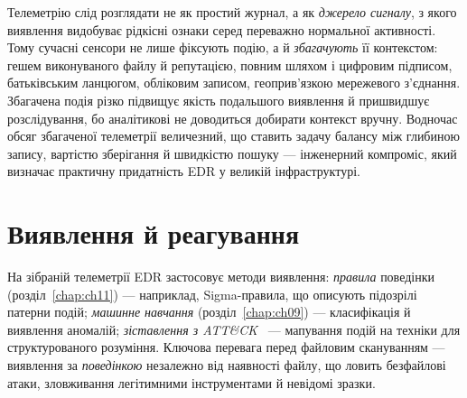 \begin{tikzfig}
\end{tikzfig}

Телеметрію слід розглядати не як простий журнал, а як \emph{джерело сигналу}, з якого виявлення видобуває рідкісні ознаки серед переважно нормальної активності. Тому сучасні сенсори не лише фіксують подію, а й \emph{збагачують} її контекстом: гешем виконуваного файлу й репутацією, повним шляхом і цифровим підписом, батьківським ланцюгом, обліковим записом, геоприв'язкою мережевого з'єднання. Збагачена подія різко підвищує якість подальшого виявлення й пришвидшує розслідування, бо аналітикові не доводиться добирати контекст вручну. Водночас обсяг збагаченої телеметрії величезний, що ставить задачу балансу між глибиною запису, вартістю зберігання й швидкістю пошуку --- інженерний компроміс, який визначає практичну придатність EDR у великій інфраструктурі.

\section{Виявлення й реагування}\label{sec:ch10-edr}

На зібраній телеметрії EDR застосовує методи виявлення: \emph{правила} поведінки (розділ~\ref{chap:ch11}) --- наприклад, Sigma-правила, що описують підозрілі патерни подій; \emph{машинне навчання} (розділ~\ref{chap:ch09}) --- класифікація й виявлення аномалій; \emph{зіставлення з ATT\&CK}~\cite{mitre-attack} --- мапування подій на техніки для структурованого розуміння. Ключова перевага перед файловим скануванням --- виявлення за \emph{поведінкою} незалежно від наявності файлу, що ловить безфайлові атаки, зловживання легітимними інструментами й невідомі зразки.

